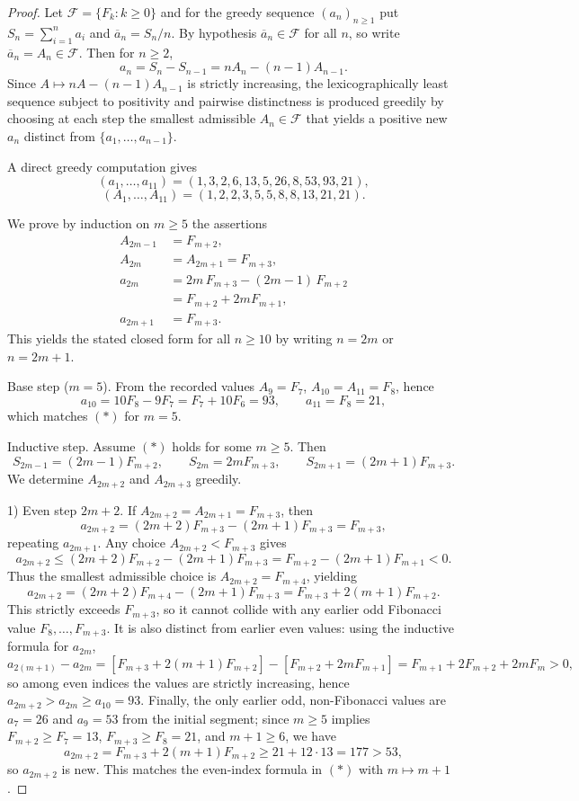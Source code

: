 \documentclass[12pt]{article}
\theoremstyle{remark}
\begin{document}
\begin{proof}
Let $\mathcal F=\{F_k:k\ge0\}$ and for the greedy sequence $(a_n)_{n\ge1}$ put $S_n=\sum_{i=1}^n a_i$ and $\overline a_n=S_n/n$. By hypothesis $\overline a_n\in\mathcal F$ for all $n$, so write $\overline a_n=A_n\in\mathcal F$. Then for $n\ge2$,
$$
 a_n=S_n-S_{n-1}=nA_n-(n-1)A_{n-1}.
$$
Since $A\mapsto nA-(n-1)A_{n-1}$ is strictly increasing, the lexicographically least sequence subject to positivity and pairwise distinctness is produced greedily by choosing at each step the smallest admissible $A_n\in\mathcal F$ that yields a positive new $a_n$ distinct from $\{a_1,\dots,a_{n-1}\}$.

A direct greedy computation gives
$$(a_1,\dots,a_{11})=(1,3,2,6,13,5,26,8,53,93,21),$$
$$(A_1,\dots,A_{11})=(1,2,2,3,5,5,8,8,13,21,21).$$

We prove by induction on $m\ge5$ the assertions
\[
\begin{aligned}
A_{2m-1}\,&=F_{m+2},\\
A_{2m}\,&=A_{2m+1}=F_{m+3},\\
a_{2m}\,&=2m\,F_{m+3}-(2m-1)\,F_{m+2}\\
\,&=F_{m+2}+2mF_{m+1},\\
a_{2m+1}\,&=F_{m+3}.
\end{aligned}
\]
This yields the stated closed form for all $n\ge10$ by writing $n=2m$ or $n=2m+1$.

Base step ($m=5$). From the recorded values $A_9=F_7$, $A_{10}=A_{11}=F_8$, hence
$$a_{10}=10F_8-9F_7=F_7+10F_6=93,\qquad a_{11}=F_8=21,$$
which matches $(\ast)$ for $m=5$.

Inductive step. Assume $(\ast)$ holds for some $m\ge5$. Then
$$
S_{2m-1}=(2m-1)F_{m+2},\qquad S_{2m}=2mF_{m+3},\qquad S_{2m+1}=(2m+1)F_{m+3}.
$$
We determine $A_{2m+2}$ and $A_{2m+3}$ greedily.

1) Even step $2m+2$. If $A_{2m+2}=A_{2m+1}=F_{m+3}$, then
$$a_{2m+2}=(2m+2)F_{m+3}-(2m+1)F_{m+3}=F_{m+3},$$
repeating $a_{2m+1}$. Any choice $A_{2m+2}<F_{m+3}$ gives
$$a_{2m+2}\le(2m+2)F_{m+2}-(2m+1)F_{m+3}=F_{m+2}-(2m+1)F_{m+1}<0.$$
Thus the smallest admissible choice is $A_{2m+2}=F_{m+4}$, yielding
$$
 a_{2m+2}=(2m+2)F_{m+4}-(2m+1)F_{m+3}=F_{m+3}+2(m+1)F_{m+2}.
$$
This strictly exceeds $F_{m+3}$, so it cannot collide with any earlier odd Fibonacci value $F_8,\dots,F_{m+3}$. It is also distinct from earlier even values: using the inductive formula for $a_{2m}$,
$$
 a_{2(m+1)}-a_{2m}=[F_{m+3}+2(m+1)F_{m+2}]-[F_{m+2}+2mF_{m+1}]
 =F_{m+1}+2F_{m+2}+2mF_m>0,
$$
so among even indices the values are strictly increasing, hence $a_{2m+2}>a_{2m}\ge a_{10}=93$. Finally, the only earlier odd, non-Fibonacci values are $a_7=26$ and $a_9=53$ from the initial segment; since $m\ge5$ implies $F_{m+2}\ge F_7=13$, $F_{m+3}\ge F_8=21$, and $m+1\ge6$, we have
$$
 a_{2m+2}=F_{m+3}+2(m+1)F_{m+2}\ge 21+12\cdot13=177>53,
$$
so $a_{2m+2}$ is new. This matches the even-index formula in $(\ast)$ with $m\mapsto m+1$.


\end{proof}
\end{document}
